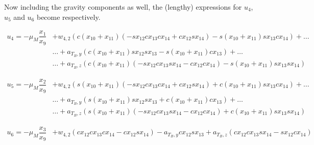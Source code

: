 Now including the gravity components as well, the (lengthy) expressions for $u_{4}$, $u_{5}$ and $u_{6}$ become  respectively.

\begin{equation} \label{eq:u4Com}
\begin{split}
u_{4}= -\mu_{M}\dfrac{x_{1}}{x_{9}}&+w_{4,2} \left( c\left(x_{10}+x_{11}\right)\left(-sx_{12} cx_{13} cx_{14} +cx_{12} sx_{14} \right)-s\left(x_{10}+x_{11}\right) sx_{13} cx_{14} \right)+ \dots \\
& \dotsc + a_{T_{B},y} \left( c\left(x_{10}+x_{11}\right) sx_{12} sx_{13} -s\left(x_{10}+x_{11}\right) cx_{13}\right)+\dots \\
& \dotsc + a_{T_{B},z} \left( c\left(x_{10}+x_{11}\right)\left(-sx_{12} cx_{13} sx_{14} -cx_{12} cx_{14} \right)-s\left(x_{10}+x_{11}\right) sx_{13} sx_{14} \right)
\end{split}
\end{equation}

\begin{equation} \label{eq:u5Com}
\begin{split}
u_{5}= -\mu_{M}\dfrac{x_{2}}{x_{9}}&+w_{4,2} \left( s\left(x_{10}+x_{11}\right)\left(-sx_{12} cx_{13} cx_{14} +cx_{12} sx_{14} \right)+c\left(x_{10}+x_{11}\right) sx_{13} cx_{14}  \right)+ \dots \\
& \dotsc+ a_{T_{B},y} \left( s\left(x_{10}+x_{11}\right) sx_{12} sx_{13} +c\left(x_{10}+x_{11}\right) cx_{13} \right)+ \dots \\
& \dotsc +a_{T_{B},z} \left(s\left(x_{10}+x_{11}\right)\left(-sx_{12} cx_{13} sx_{14} -cx_{12} cx_{14} \right)+c\left(x_{10}+x_{11}\right) sx_{13} sx_{14} \right)
\end{split}
\end{equation} 

\begin{equation} \label{eq:u6Com}
\begin{split}
u_{6}= -\mu_{M}\dfrac{x_{3}}{x_{9}}&+w_{4,2} \left(cx_{12} cx_{13} cx_{14} -cx_{12} sx_{14}  \right)  - a_{T_{B},y}cx_{12} sx_{13}  + a_{T_{B},z} \left( cx_{12} cx_{13} sx_{14} -sx_{12} cx_{14} \right)
\end{split}
\end{equation}

 
%

